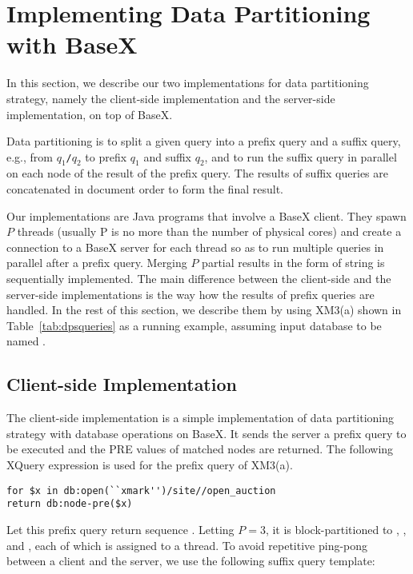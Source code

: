 \section{Implementing Data Partitioning with BaseX}
\label{sect:dpsimpl}

In this section, we describe our two implementations for data partitioning
strategy, namely the client-side implementation and the server-side
implementation, on top of BaseX.

Data partitioning is to split a given query into a prefix query and a suffix
query, e.g., from \texttt{$q_1$/$q_2$} to prefix $q_1$ and suffix $q_2$, and to
run the suffix query in parallel on each node of the result of the prefix query.
The results of suffix queries are concatenated in document order to form the 
final result.


Our implementations are Java programs that involve a BaseX client. They
spawn $P$ threads (usually P is no more than the number of physical cores) and 
create a connection to a BaseX server for each thread so
as to run multiple queries in parallel after a prefix query. Merging $P$ partial
results in the form of string is sequentially implemented. The main difference
between the client-side and the server-side implementations is the way how the results of prefix
queries are handled. In the rest of this section, we describe them by using
XM3(a) shown in Table~\ref{tab:dpsqueries} as a running example, assuming input
database to be named .

\subsection{Client-side Implementation}

The client-side implementation is a simple implementation of data partitioning
strategy with database operations on BaseX. It sends the server a prefix query 
to be executed and the PRE values of matched nodes are returned. The
following XQuery expression is used for the prefix query of XM3(a).

\begin{lstlisting}
for $x in db:open(``xmark'')/site//open_auction
return db:node-pre($x)
\end{lstlisting}

Let this prefix query return sequence . 
Letting $P = 3$, it is block-partitioned to , , and , each of which is assigned to a thread. To avoid
repetitive ping-pong between a client and the server, we use the following
suffix query template:

